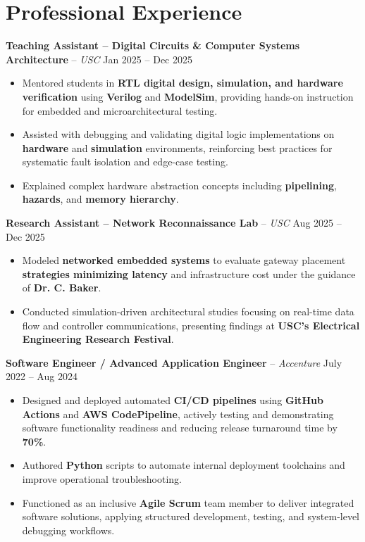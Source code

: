 \documentclass[letterpaper,11pt]{article}
\begin{document}
\section*{Professional Experience}
\textbf{Teaching Assistant – Digital Circuits \& Computer Systems Architecture} -- \textit{USC} \hfill Jan 2025 -- Dec 2025
\begin{itemize}
\item Mentored students in \textbf{RTL digital design, simulation, and hardware verification} using \textbf{Verilog} and \textbf{ModelSim}, providing hands-on instruction for embedded and microarchitectural testing.
\item Assisted with debugging and validating digital logic implementations on \textbf{hardware} and \textbf{simulation} environments, reinforcing best practices for systematic fault isolation and edge-case testing.
\item Explained complex hardware abstraction concepts including \textbf{pipelining}, \textbf{hazards}, and \textbf{memory hierarchy}.
\end{itemize}

\textbf{Research Assistant – Network Reconnaissance Lab} -- \textit{USC} \hfill Aug 2025 -- Dec 2025
\begin{itemize}
\item Modeled \textbf{networked embedded systems} to evaluate gateway placement \textbf{strategies minimizing latency} and infrastructure cost under the guidance of \textbf{Dr. C. Baker}.
\item Conducted simulation-driven architectural studies focusing on real-time data flow and controller communications, presenting findings at \textbf{USC’s Electrical Engineering Research Festival}.
\end{itemize}

\textbf{Software Engineer / Advanced Application Engineer} -- \textit{Accenture} \hfill July 2022 -- Aug 2024
\begin{itemize}
\item Designed and deployed automated \textbf{CI/CD pipelines} using \textbf{GitHub Actions} and \textbf{AWS CodePipeline}, actively testing and demonstrating software functionality readiness and reducing release turnaround time by \textbf{70\%}.
\item Authored \textbf{Python} scripts to automate internal deployment toolchains and improve operational troubleshooting.
\item Functioned as an inclusive \textbf{Agile Scrum} team member to deliver integrated software solutions, applying structured development, testing, and system-level debugging workflows.
\end{itemize}
\end{document}
